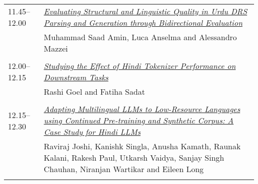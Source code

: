 \begin{tabular}{p{20mm}p{128mm}}
11.45--12.00 & \hyperlink{page.60}{\em Evaluating Structural and Linguistic Quality in Urdu DRS Parsing and Generation through Bidirectional Evaluation}\\
         & Muhammad Saad Amin, Luca Anselma and Alessandro Mazzei \\
\\

12.00--12.15 & \hyperlink{page.71}{\em Studying the Effect of Hindi Tokenizer Performance on Downstream Tasks}\\
         & Rashi Goel and Fatiha Sadat \\
\\

12.15--12.30 & \hyperlink{page.77}{\em Adapting Multilingual LLMs to Low-Resource Languages using Continued Pre-training and Synthetic Corpus: A Case Study for Hindi LLMs}\\
         & Raviraj Joshi, Kanishk Singla, Anusha Kamath, Raunak Kalani, Rakesh Paul, Utkarsh Vaidya, Sanjay Singh Chauhan, Niranjan Wartikar and Eileen Long \\
\\

\end{tabular}
\newpage
